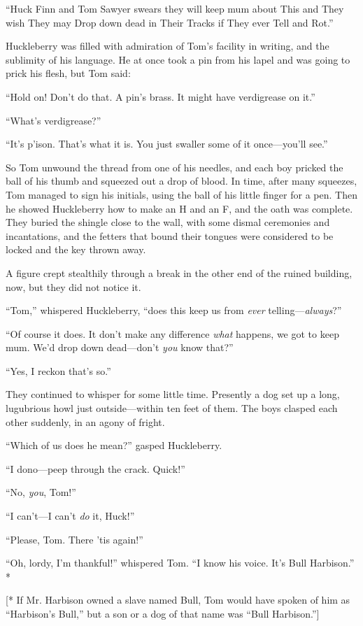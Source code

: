 \documentclass{book}
\begin{document}
“Huck Finn and Tom Sawyer swears they will keep mum about This and They wish They may Drop down dead in Their Tracks if They ever Tell and Rot.”

Huckleberry was filled with admiration of Tom’s facility in writing, and the sublimity of his language. He at once took a pin from his lapel and was going to prick his flesh, but Tom said:

“Hold on! Don’t do that. A pin’s brass. It might have verdigrease on it.”

“What’s verdigrease?”

“It’s p’ison. That’s what it is. You just swaller some of it once—you’ll see.”

So Tom unwound the thread from one of his needles, and each boy pricked the ball of his thumb and squeezed out a drop of blood. In time, after many squeezes, Tom managed to sign his initials, using the ball of his little finger for a pen. Then he showed Huckleberry how to make an H and an F, and the oath was complete. They buried the shingle close to the wall, with some dismal ceremonies and incantations, and the fetters that bound their tongues were considered to be locked and the key thrown away.

A figure crept stealthily through a break in the other end of the ruined building, now, but they did not notice it.

“Tom,” whispered Huckleberry, “does this keep us from \emph{ever} telling—\emph{always}?”

“Of course it does. It don’t make any difference \emph{what} happens, we got to keep mum. We’d drop down dead—don’t \emph{you} know that?”

“Yes, I reckon that’s so.”

They continued to whisper for some little time. Presently a dog set up a long, lugubrious howl just outside—within ten feet of them. The boys clasped each other suddenly, in an agony of fright.

“Which of us does he mean?” gasped Huckleberry.

“I dono—peep through the crack. Quick!”

“No, \emph{you}, Tom!”

“I can’t—I can’t \emph{do} it, Huck!”

“Please, Tom. There ’tis again!”

“Oh, lordy, I’m thankful!” whispered Tom. “I know his voice. It’s Bull Harbison.” *

[* If Mr. Harbison owned a slave named Bull, Tom would have spoken of him as “Harbison’s Bull,” but a son or a dog of that name was “Bull Harbison.”]
\end{document}
